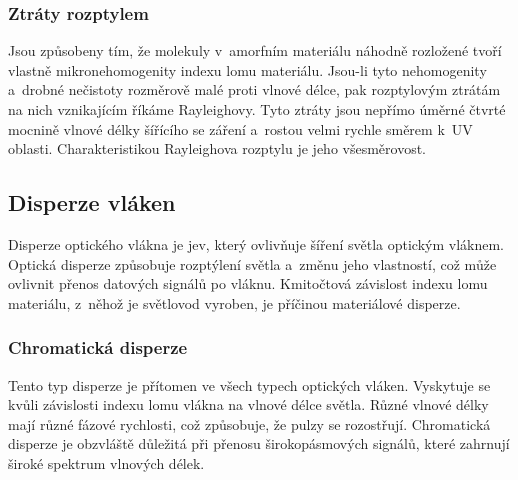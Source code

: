 \subsubsection{Ztráty rozptylem}
Jsou způsobeny tím, že molekuly v~amorfním materiálu náhodně rozložené tvoří vlastně mikronehomogenity indexu lomu materiálu. Jsou-li tyto nehomogenity a~drobné nečistoty rozměrově malé proti vlnové délce, pak rozptylovým ztrátám na nich vznikajícím říkáme Rayleighovy. Tyto ztráty jsou nepřímo úměrné čtvrté mocnině vlnové délky šířícího se záření a~rostou velmi rychle směrem k~UV oblasti. Charakteristikou Rayleighova rozptylu je jeho všesměrovost.

\subsection{Disperze vláken}
Disperze optického vlákna je jev, který ovlivňuje šíření světla optickým vláknem. Optická disperze způsobuje rozptýlení světla a~změnu jeho vlastností, což může ovlivnit přenos datových signálů po vláknu. Kmitočtová závislost indexu lomu materiálu, z~něhož je světlovod vyroben, je příčinou materiálové disperze.

\subsubsection{Chromatická disperze}
Tento typ disperze je přítomen ve všech typech optických vláken. Vyskytuje se kvůli závislosti indexu lomu vlákna na vlnové délce světla. Různé vlnové délky mají různé fázové rychlosti, což způsobuje, že pulzy se rozostřují. Chromatická disperze je obzvláště důležitá při přenosu širokopásmových signálů, které zahrnují široké spektrum vlnových délek.

